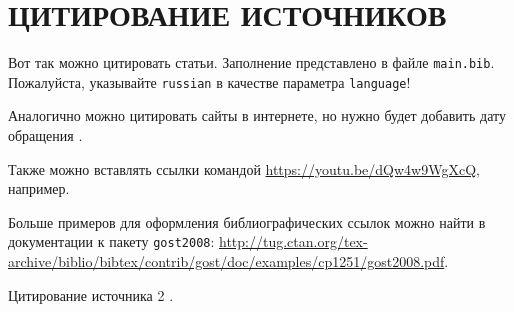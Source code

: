 \section{ЦИТИРОВАНИЕ ИСТОЧНИКОВ}

Вот так \cite{Article} можно цитировать статьи. 
Заполнение представлено в файле \texttt{main.bib}. 
Пожалуйста, указывайте \texttt{russian} в качестве параметра \texttt{language}!

Аналогично можно цитировать сайты в интернете, но нужно будет добавить 
дату обращения \cite{Wikipedia}.

Также можно вставлять ссылки командой \url{https://youtu.be/dQw4w9WgXcQ}, например.

Больше примеров для оформления библиографических ссылок можно найти в 
документации к пакету \texttt{gost2008}: 
\url{http://tug.ctan.org/tex-archive/biblio/bibtex/contrib/gost/doc/examples/cp1251/gost2008.pdf}.

\lipsum[1-2]

Цитирование источника 2 \cite{cite_1_11}.
